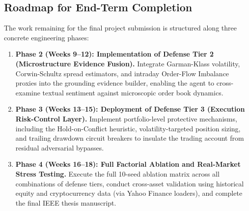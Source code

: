 \documentclass[11pt,a4paper]{article}
\begin{document}
\subsection{Roadmap for End-Term Completion}
The work remaining for the final project submission is structured along three concrete engineering phases:
\begin{enumerate}
    \item \textbf{Phase 2 (Weeks 9--12): Implementation of Defense Tier 2 (Microstructure Evidence Fusion).} 
    Integrate Garman-Klass volatility, Corwin-Schultz spread estimators, and intraday Order-Flow Imbalance proxies into the grounding evidence builder, enabling the agent to cross-examine textual sentiment against microscopic order book dynamics.
    \item \textbf{Phase 3 (Weeks 13--15): Deployment of Defense Tier 3 (Execution Risk-Control Layer).} 
    Implement portfolio-level protective mechanisms, including the Hold-on-Conflict heuristic, volatility-targeted position sizing, and trailing drawdown circuit breakers to insulate the trading account from residual adversarial bypasses.
    \item \textbf{Phase 4 (Weeks 16--18): Full Factorial Ablation and Real-Market Stress Testing.} 
    Execute the full 10-seed ablation matrix across all combinations of defense tiers, conduct cross-asset validation using historical equity and cryptocurrency data (via Yahoo Finance loaders), and complete the final IEEE thesis manuscript.
\end{enumerate}

\newpage


\end{document}
